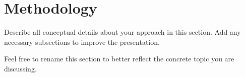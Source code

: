 \documentclass[../report.tex]{subfiles}
\begin{document}
    \section{Methodology}
    \label{sec:methodology}

    Describe all conceptual details about your approach in this section.
    Add any necessary subsections to improve the presentation.

    Feel free to rename this section to better reflect the concrete topic you are discussing.
\end{document}

